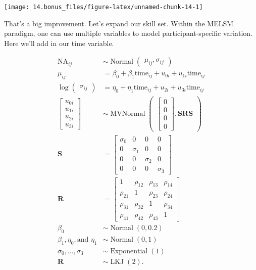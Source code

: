 \documentclass[]{article}
\begin{document}
\begin{center}\texttt{[image: 14.bonus\_files/figure-latex/unnamed-chunk-14-1]} \end{center}

That's a big improvement. Let's expand our skill set. Within the MELSM
paradigm, one can use multiple variables to model participant-specific
variation. Here we'll add in our time variable.

\[
\begin{align*}
\text{NA}_{ij} & \sim \operatorname{Normal}\begin{pmatrix} \mu_{ij}, \sigma_{ij} \end{pmatrix} \\
\mu_{ij} & = \beta_0 + \beta_1 \text{time}_{ij} + u_{0i} + u_{1i} \text{time}_{ij} \\ \log \begin{pmatrix} \sigma_{ij} \end{pmatrix} & = \eta_0 + \eta_1 \text{time}_{ij} + u_{2i} + u_{3i} \text{time}_{ij} \\
\begin{bmatrix} u_{0i} \\ u_{1i} \\ u_{2i} \\ u_{3i} \end{bmatrix} & \sim \operatorname{MVNormal}\begin{pmatrix} \begin{bmatrix} 0 \\ 0 \\ 0 \\ 0 \end{bmatrix}, \mathbf S \mathbf R \mathbf S \end{pmatrix} \\
\mathbf S & = \begin{bmatrix} \sigma_0 & 0 & 0 & 0 \\ 0 & \sigma_1 & 0 & 0 \\ 0 & 0 & \sigma_2 & 0 \\ 0 & 0 & 0 & \sigma_3 \end{bmatrix} \\
\mathbf R & = \begin{bmatrix} 1 & \rho_{12} & \rho_{13} & \rho_{14} \\ \rho_{21} & 1 & \rho_{23} & \rho_{24} \\ \rho_{31} & \rho_{32} & 1 & \rho_{34} \\ \rho_{41} & \rho_{42} & \rho_{43} & 1 \end{bmatrix} \\
\beta_0   & \sim \operatorname{Normal}(0, 0.2) \\
\beta_1, \eta_0, \text{and } \eta_1 & \sim \operatorname{Normal}(0, 1) \\
\sigma_0,..., \sigma_3 & \sim \operatorname{Exponential}(1) \\
\mathbf R & \sim \operatorname{LKJ}(2).
\end{align*}
\]
\end{document}
